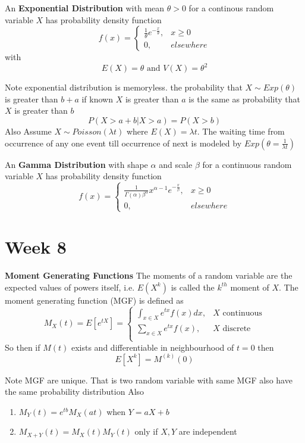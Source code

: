 \documentclass[11pt]{article}
\begin{document}
$ $\\
An \textbf{Exponential Distribution} with mean $\theta > 0$ for a continous random variable $X$ has probability density function
\[
  f(x) =
  \begin{cases}
    \frac{1}{\theta} e^{-\frac{x}{\theta}}, & x\geq 0\\
    0, & elsewhere
  \end{cases}
\]
with
\[
  E(X) = \theta \text{ and } V(X) = \theta^2
\]
\begin{rem}
  Note exponential distribution is memoryless. the probability that $X\sim Exp(\theta)$ is greater than $b+a$ if known $X$ is greater than $a$ is the same as probability that $X$ is greater than $b$
  \[
    P(X > a+b | X>a) = P(X>b)
  \]
  Also Assume $X\sim Poisson(\lambda t)$ where $E(X) = \lambda t$. The waiting time from occurrence of any one event till occurrence of next is modeled by $Exp(\theta = \frac{1}{\lambda t})$

$ $\\
An \textbf{Gamma Distribution} with shape $\alpha$ and scale $\beta$ for a continuous random variable $X$ has probability density function
\[
  f(x) =
  \begin{cases}
    \frac{1}{\Gamma(\alpha)\beta^{\alpha}} x^{\alpha-1}e^{-\frac{x}{\beta}}, & x\geq 0 \\
    0, & elsewhere
  \end{cases}
\]

\end{rem}


\section*{Week 8}

\textbf{Moment Generating Functions} The moments of a random variable are the expected values of powers itself, i.e. $E(X^k)$ is called the $k^{th}$ moment of $X$. The moment generating function (MGF) is defined as
\[
  M_X(t) = E[e^{tX}] =
  \begin{cases}
    \int_{x\in X} e^{tx} f(x) dx, & X \text{ continuous}\\
    \sum_{x\in X} e^{tx} f(x), & X \text{ discrete}\\
  \end{cases}
\]
So then if $M(t)$ exists and differentiable in neighbourhood of $t=0$ then
\[
  E[X^k] = M^{(k)}(0)
\]

\begin{rem}
  Note MGF are unique. That is two random variable with same MGF also have the same probability distribution
  Also
  \begin{enumerate}
    \item $M_{Y}(t) = e^{tb}M_X(at)$ when $Y=aX+b$
    \item $M_{X+Y}(t) = M_X(t)M_Y(t)$ only if $X,Y$ are independent
  \end{enumerate}
\end{rem}
\end{document}
